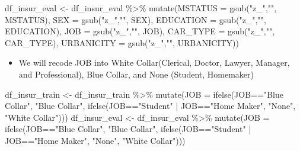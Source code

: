 \documentclass[
]{article}
\newenvironment{Shaded}{\begin{snugshade}}{\end{snugshade}}
\newcommand{\AttributeTok}[1]{\textcolor[rgb]{0.77,0.63,0.00}{#1}}
\newcommand{\FunctionTok}[1]{\textcolor[rgb]{0.00,0.00,0.00}{#1}}
\newcommand{\NormalTok}[1]{#1}
\newcommand{\OtherTok}[1]{\textcolor[rgb]{0.56,0.35,0.01}{#1}}
\newcommand{\SpecialCharTok}[1]{\textcolor[rgb]{0.00,0.00,0.00}{#1}}
\newcommand{\StringTok}[1]{\textcolor[rgb]{0.31,0.60,0.02}{#1}}
\providecommand{\tightlist}{%
  \setlength{\itemsep}{0pt}\setlength{\parskip}{0pt}}
\begin{document}
\begin{Shaded}
\begin{Highlighting}[]
\NormalTok{df\_insur\_eval }\OtherTok{\textless{}{-}}\NormalTok{ df\_insur\_eval }\SpecialCharTok{\%\textgreater{}\%} 
  \FunctionTok{mutate}\NormalTok{(}\AttributeTok{MSTATUS =} \FunctionTok{gsub}\NormalTok{(}\StringTok{"z\_"}\NormalTok{,}\StringTok{""}\NormalTok{, MSTATUS), }\AttributeTok{SEX =} \FunctionTok{gsub}\NormalTok{(}\StringTok{"z\_"}\NormalTok{,}\StringTok{""}\NormalTok{, SEX),}
         \AttributeTok{EDUCATION =} \FunctionTok{gsub}\NormalTok{(}\StringTok{"z\_"}\NormalTok{,}\StringTok{""}\NormalTok{, EDUCATION), }\AttributeTok{JOB =} \FunctionTok{gsub}\NormalTok{(}\StringTok{"z\_"}\NormalTok{,}\StringTok{""}\NormalTok{, JOB),}
         \AttributeTok{CAR\_TYPE =} \FunctionTok{gsub}\NormalTok{(}\StringTok{"z\_"}\NormalTok{,}\StringTok{""}\NormalTok{, CAR\_TYPE), }\AttributeTok{URBANICITY =} \FunctionTok{gsub}\NormalTok{(}\StringTok{"z\_"}\NormalTok{,}\StringTok{""}\NormalTok{,}
\NormalTok{                                                               URBANICITY))}
\end{Highlighting}
\end{Shaded}

\begin{itemize}
\tightlist
\item
  We will recode JOB into White Collar(Clerical, Doctor, Lawyer,
  Manager, and Professional), Blue Collar, and None (Student, Homemaker)
\end{itemize}

\begin{Shaded}
\begin{Highlighting}[]
\NormalTok{df\_insur\_train }\OtherTok{\textless{}{-}}\NormalTok{ df\_insur\_train }\SpecialCharTok{\%\textgreater{}\%} 
  \FunctionTok{mutate}\NormalTok{(}\AttributeTok{JOB =} \FunctionTok{ifelse}\NormalTok{(JOB}\SpecialCharTok{==}\StringTok{"Blue Collar"}\NormalTok{, }\StringTok{"Blue Collar"}\NormalTok{, }
                      \FunctionTok{ifelse}\NormalTok{(JOB}\SpecialCharTok{==}\StringTok{"Student"} \SpecialCharTok{|}\NormalTok{ JOB}\SpecialCharTok{==}\StringTok{"Home Maker"}\NormalTok{,}
                             \StringTok{"None"}\NormalTok{,}
                             \StringTok{"White Collar"}\NormalTok{)))}
\NormalTok{df\_insur\_eval }\OtherTok{\textless{}{-}}\NormalTok{ df\_insur\_eval }\SpecialCharTok{\%\textgreater{}\%} 
  \FunctionTok{mutate}\NormalTok{(}\AttributeTok{JOB =} \FunctionTok{ifelse}\NormalTok{(JOB}\SpecialCharTok{==}\StringTok{"Blue Collar"}\NormalTok{, }\StringTok{"Blue Collar"}\NormalTok{, }
                      \FunctionTok{ifelse}\NormalTok{(JOB}\SpecialCharTok{==}\StringTok{"Student"} \SpecialCharTok{|}\NormalTok{ JOB}\SpecialCharTok{==}\StringTok{"Home Maker"}\NormalTok{,}
                             \StringTok{"None"}\NormalTok{, }\StringTok{"White Collar"}\NormalTok{)))}
\end{Highlighting}
\end{Shaded}
\end{document}

